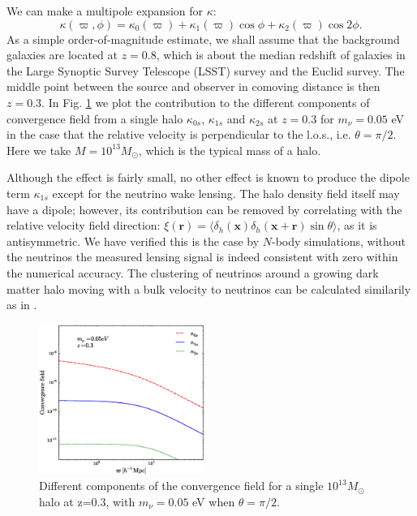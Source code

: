 \documentclass[aps,prl,twocolumn,showpacs,superscriptaddress,groupedaddress,nofootinbib]{revtex4}  %
\begin{document}
We can make a multipole expansion for $\kappa$:
$$\kappa(\varpi,\phi)=\kappa_0(\varpi)+ \kappa_1
(\varpi)\cos\phi+\kappa_2(\varpi)\cos2\phi.$$ 
As a simple order-of-magnitude 
estimate, we shall assume that the background galaxies
are located at $z=0.8$, which is about the median redshift of galaxies
in the Large Synoptic Survey Telescope (LSST) survey\cite{Abell:2009}
and the Euclid survey\cite{Laureijs:2011,Amendola:2012}. The  
middle point between the source and observer in comoving distance 
is then $z=0.3$. In Fig. \ref{fig:kappa} we plot the contribution to the different components
of convergence field from a single halo $\kappa_{0s}$, $\kappa_{1s}$ and 
$\kappa_{2s}$ at $z=0.3$
for $m_\nu=0.05$ eV in the case that the relative velocity is
perpendicular to the l.o.s., i.e. $\theta=\pi/2$.
Here we take $M=10^{13}M_\odot$, which is the typical mass of a halo.

Although the effect is fairly small, no other effect is known to produce the dipole 
term $\kappa_{1s}$  except for the neutrino wake lensing.
The halo density field itself may have a dipole; however, its contribution 
can be removed by correlating with the relative velocity field 
direction: $\xi(\bm r) = \langle \delta_h(\bm x)\delta_h(\bm
  x + \bm r) \sin\theta \rangle$,  as it is antisymmetric.  We have
  verified this is the case by $N$-body simulations, without the neutrinos
the measured lensing signal is indeed consistent with zero within 
the numerical accuracy.
The clustering of neutrinos around a growing dark matter halo moving with
a bulk velocity to neutrinos can be calculated similarily as in
\cite{2014PhRvD..89f3502L}.


\begin{figure}[tbp]
  \begin{center}
    \includegraphics[width=0.48\textwidth]{fig_3.eps}
  \end{center}
  \vspace{-0.7cm}
  \caption{\label{fig:kappa} Different components of the convergence
    field for a single $10^{13}  M_\odot$ halo at z=0.3, with $m_\nu=0.05$ eV when
    $\theta=\pi/2$.}
\end{figure}
\end{document}
